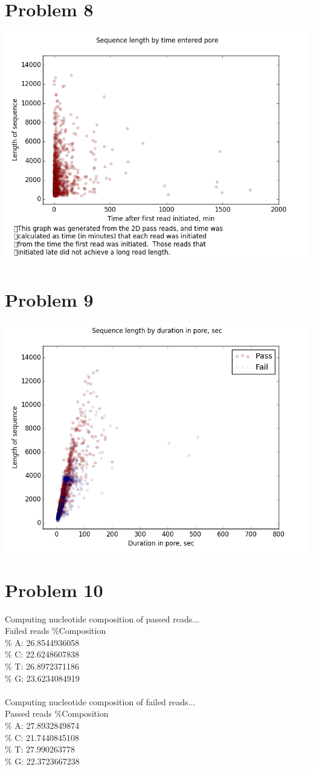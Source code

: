 \documentclass[11pt]{article}
\begin{document}
\section*{Problem 8}
\includegraphics[width=\textwidth]{q8}
\section*{Problem 9}
\includegraphics[width=\textwidth]{q9}
\section*{Problem 10}
Computing nucleotide composition of passed reads...\\
Failed reads \%Composition\\
\% A: 26.8544936058\\
\% C: 22.6248607838\\
\% T: 26.8972371186\\
\% G: 23.6234084919\\
\\
Computing nucleotide composition of failed reads...\\
Passed reads \%Composition\\
\% A: 27.8932849874\\
\% C: 21.7440845108\\
\% T: 27.990263778\\
\% G: 22.3723667238\\
\end{document}
